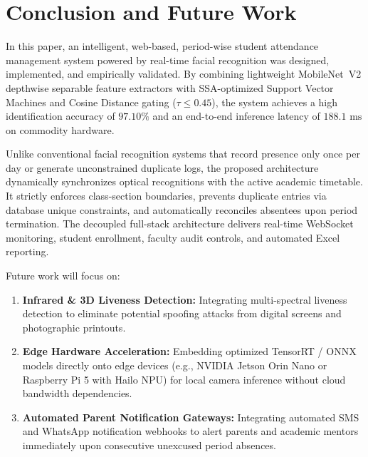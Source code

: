 \documentclass[conference]{IEEEtran}
\begin{document}
\section{Conclusion and Future Work}
In this paper, an intelligent, web-based, period-wise student attendance management system powered by real-time facial recognition was designed, implemented, and empirically validated. By combining lightweight MobileNet~V2 depthwise separable feature extractors with SSA-optimized Support Vector Machines and Cosine Distance gating ($\tau \le 0.45$), the system achieves a high identification accuracy of $97.10\%$ and an end-to-end inference latency of $188.1\text{ ms}$ on commodity hardware. 

Unlike conventional facial recognition systems that record presence only once per day or generate unconstrained duplicate logs, the proposed architecture dynamically synchronizes optical recognitions with the active academic timetable. It strictly enforces class-section boundaries, prevents duplicate entries via database unique constraints, and automatically reconciles absentees upon period termination. The decoupled full-stack architecture delivers real-time WebSocket monitoring, student enrollment, faculty audit controls, and automated Excel reporting.

Future work will focus on:
\begin{enumerate}
    \item \textbf{Infrared \& 3D Liveness Detection:} Integrating multi-spectral liveness detection to eliminate potential spoofing attacks from digital screens and photographic printouts.
    \item \textbf{Edge Hardware Acceleration:} Embedding optimized TensorRT / ONNX models directly onto edge devices (e.g., NVIDIA Jetson Orin Nano or Raspberry Pi 5 with Hailo NPU) for local camera inference without cloud bandwidth dependencies.
    \item \textbf{Automated Parent Notification Gateways:} Integrating automated SMS and WhatsApp notification webhooks to alert parents and academic mentors immediately upon consecutive unexcused period absences.
\end{enumerate}

\balance
\end{document}
